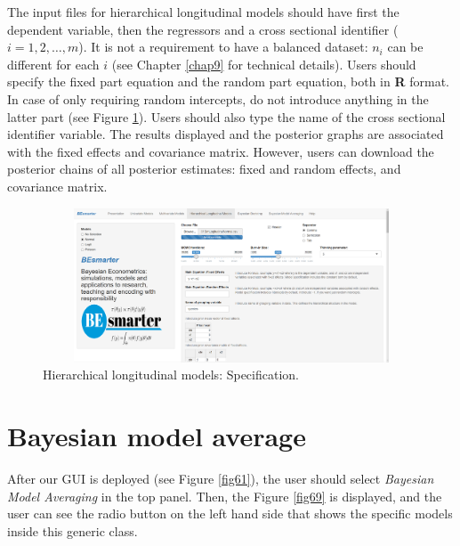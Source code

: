 The input files for hierarchical longitudinal models should have first the dependent variable, then the regressors and a cross sectional identifier ($i=1,2,\dots,m$). It is not a requirement to have a balanced dataset: $n_i$ can be different for each $i$ (see Chapter \ref{chap9} for technical details). Users should specify the fixed part equation and the random part equation,
both in \textbf{R} format. In case of only requiring random intercepts, do not introduce anything in the latter part (see Figure \ref{fig68}). Users should also type the name of the cross sectional identifier variable. The results displayed and the posterior graphs are associated with the fixed effects and covariance matrix. However, users can download the posterior chains of all posterior estimates: fixed and random effects, and covariance matrix.

\begin{figure}
	\includegraphics[width=340pt, height=130pt]{Chapters/chapterGUI/figures/Figure8.png}
	\caption[List of figure caption goes here]{Hierarchical longitudinal models: Specification.}\label{fig68}
\end{figure} 

\section{Bayesian model average}\label{secGUI6}

After our GUI is deployed (see Figure \ref{fig61}), the user should select \textit{Bayesian Model Averaging} in the top panel. Then, the Figure \ref{fig69} is displayed, and the user can see the radio button on the left hand side that shows the specific models inside this generic class.

